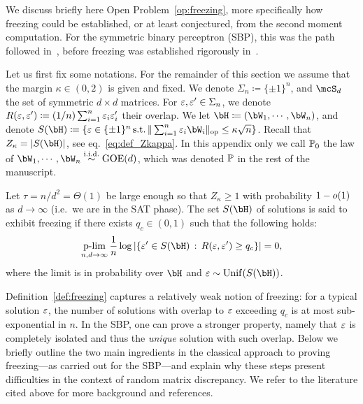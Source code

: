 We discuss briefly here Open Problem~\ref{op:freezing}, more specifically how freezing could be established, 
or at least conjectured, from the second moment computation.
For the symmetric binary perceptron (SBP), this was the path followed in~\cite{aubin2019storage}, before
freezing was established rigorously in~\cite{perkins2021frozen,abbe2022proof}.

\myskip 
Let us first fix some notations.
For the remainder of this section we assume that the margin $\kappa \in (0,2)$ is given and fixed.
We denote $\Sigma_n \coloneqq \{\pm 1\}^n$, and $\mcS_d$ the set of symmetric $d \times d$ matrices.
For $\varepsilon, \varepsilon' \in \Sigma_n$, we denote $R(\varepsilon, \varepsilon') \coloneqq (1/n) \sum_{i=1}^n \varepsilon_i \varepsilon'_i$ their overlap.
We let $\bH \coloneqq (\bW_1, \cdots, \bW_n)$, and denote $S(\bH) \coloneqq \{\eps \in \{\pm 1\}^n \, \textrm{s.t.} \, \|\sum_{i=1}^n \eps_i \bW_i\|_{\op} \leq \kappa \sqrt{n} \}$.
Recall that $Z_\kappa = |S(\bH)|$, see eq.~\eqref{eq:def_Zkappa}.
In this appendix only we call $\mathbb{P}_0$ the law of $\bW_1, \cdots, \bW_n \iid \GOE(d)$, which was denoted $\mathbb{P}$ in the rest of the manuscript.

\begin{definition}[Freezing]\label{def:freezing}
    Let $\tau = n/d^2 = \Theta(1)$ be large enough so that $Z_\kappa \geq 1$ with probability $1 - o(1)$ as $d \to \infty$ (i.e.\ we are in the SAT phase).
    The set $S(\bH)$ of solutions is said to exhibit freezing
    if there exists $q_c \in (0,1)$ such that the following holds:
    \begin{align*}
        \plim_{n,d \to \infty} \frac{1}{n} \log |\{\eps' \in S(\bH) \, : \, R(\eps, \eps') \geq q_c\}| = 0,
    \end{align*}
    where the limit is in probability over $\bH$ and $\eps \sim \Unif(S(\bH))$.
\end{definition}
\noindent
Definition~\ref{def:freezing} captures a relatively weak notion of freezing: for a typical solution $\varepsilon$, the number of solutions with overlap to $\varepsilon$ exceeding $q_c$ is at most sub-exponential in $n$. 
In the SBP, one can prove a stronger property, namely that $\varepsilon$ is completely isolated and thus the \emph{unique} solution with such overlap. 
Below we briefly outline the two main ingredients in the classical approach to proving freezing---as carried out for the SBP---and explain why these steps present difficulties in the context of random matrix discrepancy. 
We refer to the literature cited above for more background and references.

